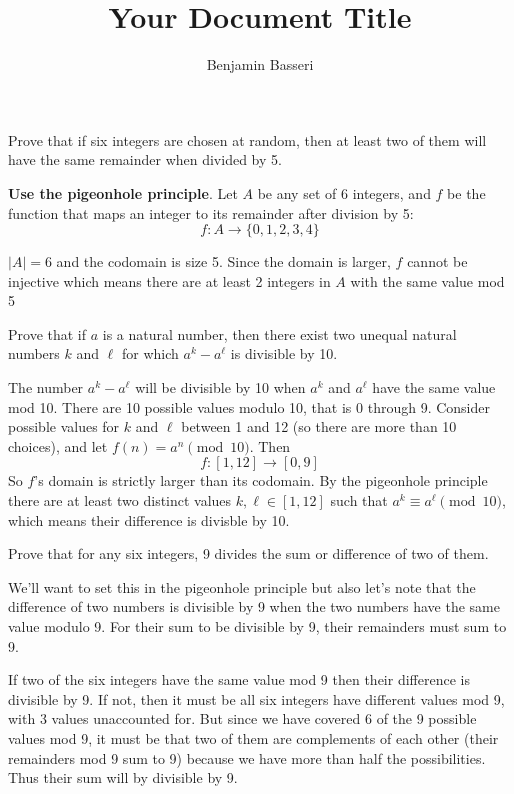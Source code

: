 \documentclass{article}
\title{Your Document Title}
\author{Benjamin Basseri}
\begin{document}
\maketitle

\begin{problem}
Prove that if six integers are chosen at random, then at least two of them will have the same remainder when divided by 5.
\end{problem}

\textbf{Use the pigeonhole principle}. Let $A$ be any set of 6 integers, and $f$ be the function that maps an integer to its remainder after division by 5:
$$f: A \to \{0, 1, 2, 3, 4\}$$

$|A| = 6$ and the codomain is size 5. Since the domain is larger, $f$ cannot be injective which means there are at least 2 integers in $A$ with the same value mod 5

\begin{problem}
Prove that if $a$ is a natural number, then there exist two unequal natural numbers $k$ and $\ell$ for which $a^k - a^\ell$ is divisible by 10.
\end{problem}

The number $a^k - a^\ell$ will be divisible by 10 when $a^k$ and $a^\ell$ have the same value mod 10. There are 10 possible values modulo 10, that is 0 through 9. Consider possible values for $k$ and $\ell$ between 1 and 12 (so there are more than 10 choices), and let $f(n) = a^n \pmod{10}$. Then
$$f: [1, 12] \to [0, 9]$$
So $f$'s domain is strictly larger than its codomain. By the pigeonhole principle there are at least two distinct values $k, \ell \in [1, 12]$ such that $a^k \equiv a^\ell \pmod{10}$, which means their difference is divisble by 10.

\begin{problem}
Prove that for any six integers, 9 divides the sum or difference of two of them.
\end{problem}

We'll want to set this in the pigeonhole principle but also let's note that the difference of two numbers is divisible by 9 when the two numbers have the same value modulo 9. For their sum to be divisible by 9, their remainders must sum to 9.

If two of the six integers have the same value mod 9 then their difference is divisible by 9. If not, then it must be all six integers have different values mod 9, with 3 values unaccounted for. But since we have covered 6 of the 9 possible values mod 9, it must be that two of them are complements of each other (their remainders mod 9 sum to 9) because we have more than half the possibilities. Thus their sum will by divisible by 9.
\end{document}
